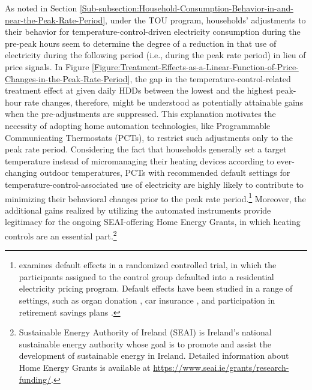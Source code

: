 As noted in Section \ref{Sub-subsection:Household-Consumption-Behavior-in-and-near-the-Peak-Rate-Period}, under the TOU program, households' adjustments to their behavior for temperature-control-driven electricity consumption during the pre-peak hours seem to determine the degree of a reduction in that use of electricity during the following period (i.e., during the peak rate period) in lieu of price signals. In Figure \ref{Figure:Treatment-Effects-as-a-Linear-Function-of-Price-Changes-in-the-Peak-Rate-Period}, the gap in the temperature-control-related treatment effect at given daily HDDs between the lowest and the highest peak-hour rate changes, therefore, might be understood as potentially attainable gains when the pre-adjustments are suppressed. This explanation motivates the necessity of adopting home automation technologies, like Programmable Communicating Thermostats (PCTs), to restrict such adjustments only to the peak rate period. Considering the fact that households generally set a target temperature instead of micromanaging their heating devices according to ever-changing outdoor temperatures, PCTs with recommended default settings for temperature-control-associated use of electricity are highly likely to contribute to minimizing their behavioral changes prior to the peak rate period.\footnote{\cite{Default-Effects-and-Follow-on-Behavior_Evidence-from-an-Electricity-Pricing-Program_Fowlie-et-al_2021} examines default effects in a randomized controlled trial, in which the participants assigned to the control group defaulted into a residential electricity pricing program. Default effects have been studied in a range of settings, such as organ donation \citep{Medicine_Do-Defaults-Save-Lives_Johnson-and-Goldstein_2003, The-Impact-of-Presumed-Consent-Legislation-on-Cadaveric-Organ-Donoation_Abadie-and-Gay_2006}, car insurance \citep{Framing-Probability-Distortions-and-Insurance-Decisions_Johnson-et-al_1993}, and participation in retirement savings plans \citep{Status-Quo-Bias-in-Decision-Making_Samuelson-and-Zeckhauser_1988, The-Power-of-Suggestion_Madrian-and-Shea_2001, For-Better-or-For-Worse_Choi-et-al_2019}.} Moreover, the additional gains realized by utilizing the automated instruments provide legitimacy for the ongoing SEAI-offering Home Energy Grants, in which heating controls are an essential part.\footnote{Sustainable Energy Authority of Ireland (SEAI) is Ireland's national sustainable energy authority whose goal is to promote and assist the development of sustainable energy in Ireland. Detailed information about Home Energy Grants is available at \url{https://www.seai.ie/grants/research-funding/}.} 
